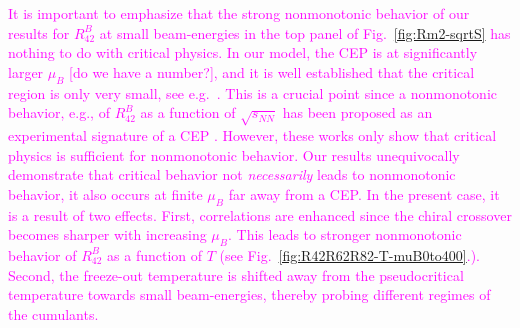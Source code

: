 \documentclass[%
reprint,
superscriptaddress,
showpacs,preprintnumbers,
 amsmath,amssymb,
 aps,
prd,
]{revtex4-1}
\def\Fig#1{Fig.~\ref{#1}} \def\Tab#1{Tab.~\ref{#1}}
\newcommand{\colfab}[1]{\textcolor{magenta}{#1}}
\begin{document}
\colfab{
It is important to emphasize that the strong nonmonotonic behavior of our results for $R^{B}_{42}$ at small beam-energies in the top panel of \Fig{fig:Rm2-sqrtS} has nothing to do with critical physics. In our model, the CEP is at significantly larger $\mu_B$ [do we have a number?], and it is well established that the critical region is only very small, see e.g.\ \cite{Schaefer:2006ds}. This is a crucial point since a nonmonotonic behavior, e.g., of $R^{B}_{42}$ as a function of $\sqrt{s_{NN}}$ has been proposed as an experimental signature of a CEP \cite{Stephanov:1999zu, Stephanov:2011pb}. However, these works only show that critical physics is sufficient for nonmonotonic behavior. Our results unequivocally demonstrate that critical behavior not \emph{necessarily} leads to nonmonotonic behavior, it also occurs at finite $\mu_B$ far away from a CEP. In the present case, it is a result of two effects. First, correlations are enhanced since the chiral crossover becomes sharper with increasing $\mu_B$. This leads to stronger nonmonotonic behavior of $R^{B}_{42}$ as a function of $T$ (see \Fig{fig:R42R62R82-T-muB0to400}.). Second, the freeze-out temperature is shifted away from the pseudocritical temperature towards small beam-energies, thereby probing different regimes of the cumulants.
}

\end{document}
